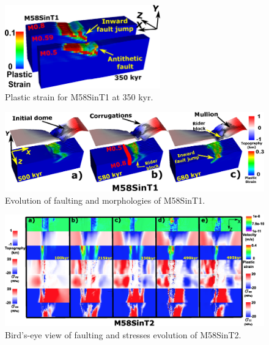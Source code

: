 \documentclass[draft,gc]{agutex}
\begin{document}
\begin{figure}[h]
\noindent\includegraphics[width=0.6\textwidth]{./Figures/fig_Results_3_4_2_3D_Antithetic_fault.eps}
 \caption{Plastic strain for M58SinT1 at 350 kyr.}
\label{fig_Results_3_4_2_3D_Antithetic_fault}
\end{figure}

\begin{figure}[h]
\noindent\includegraphics[width=1.0\textwidth]{./Figures/fig_Results_3_4_2_M58SinT1_mullion_riderBlock_inwardFaultJump.eps}
 \caption{Evolution of faulting and morphologies of M58SinT1.}
\label{fig_Results_3_4_2_M58SinT1_mullion_riderBlock_inwardFaultJump}
\end{figure}

\begin{figure}[h]
\noindent\includegraphics[width=1.0\textwidth]{./Figures/fig_Results_Weakening_6_M58SinT2_time_evolution.eps}
 \caption{Bird's-eye view of faulting and stresses evolution of M58SinT2.}
\label{fig_Results_Weakenging_6}
\end{figure}
\end{document}
